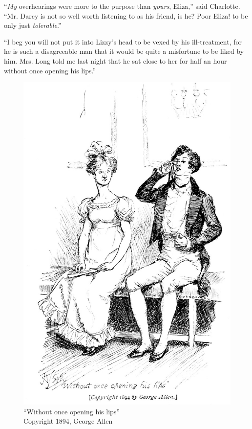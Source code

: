 ``\textit{My} overhearings were more to the purpose than \textit{yours}, Eliza,'' said Charlotte. ``Mr. Darcy is not so well worth listening to as his friend, is he? Poor Eliza! to be only just \textit{tolerable}.''

``I beg you will not put it into Lizzy's head to be vexed by his ill-treatment, for he is such a disagreeable man that it would be quite a misfortune to be liked by him. Mrs. Long told me last night that he sat close to her for half an hour without once opening his lips.''

\begin{figure}[htbp]
    \centering
    \includegraphics[width=\textwidth]{illustrations/i_053.jpg}
    \caption{“Without once opening his lips”\\ Copyright 1894, George Allen}
    \label{fig:image}
\end{figure}


